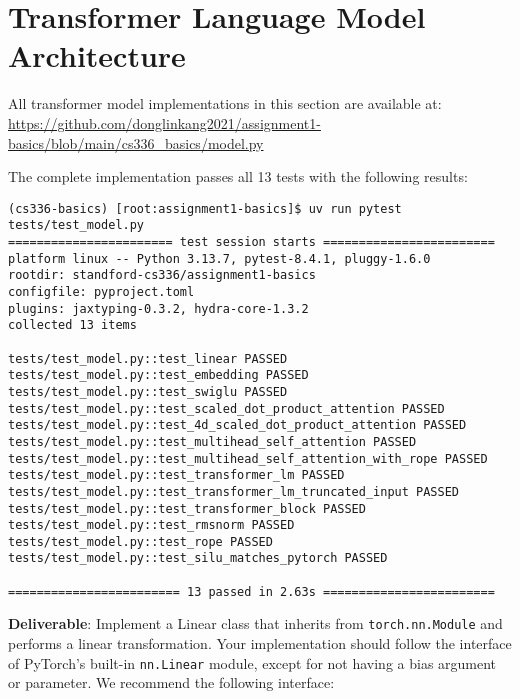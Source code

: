 \section{Transformer Language Model Architecture}

All transformer model implementations in this section are available at: \url{https://github.com/donglinkang2021/assignment1-basics/blob/main/cs336_basics/model.py}

The complete implementation passes all 13 tests with the following results:
\begin{lstlisting}
(cs336-basics) [root:assignment1-basics]$ uv run pytest tests/test_model.py
======================= test session starts ========================
platform linux -- Python 3.13.7, pytest-8.4.1, pluggy-1.6.0
rootdir: standford-cs336/assignment1-basics
configfile: pyproject.toml
plugins: jaxtyping-0.3.2, hydra-core-1.3.2
collected 13 items                                                 

tests/test_model.py::test_linear PASSED
tests/test_model.py::test_embedding PASSED
tests/test_model.py::test_swiglu PASSED
tests/test_model.py::test_scaled_dot_product_attention PASSED
tests/test_model.py::test_4d_scaled_dot_product_attention PASSED
tests/test_model.py::test_multihead_self_attention PASSED
tests/test_model.py::test_multihead_self_attention_with_rope PASSED
tests/test_model.py::test_transformer_lm PASSED
tests/test_model.py::test_transformer_lm_truncated_input PASSED
tests/test_model.py::test_transformer_block PASSED
tests/test_model.py::test_rmsnorm PASSED
tests/test_model.py::test_rope PASSED
tests/test_model.py::test_silu_matches_pytorch PASSED

======================== 13 passed in 2.63s ========================
\end{lstlisting}


\textbf{Deliverable}: Implement a Linear class that inherits from \lstinline{torch.nn.Module} and performs a linear transformation. Your implementation should follow the interface of PyTorch's built-in \lstinline{nn.Linear} module, except for not having a bias argument or parameter. We recommend the following interface:

